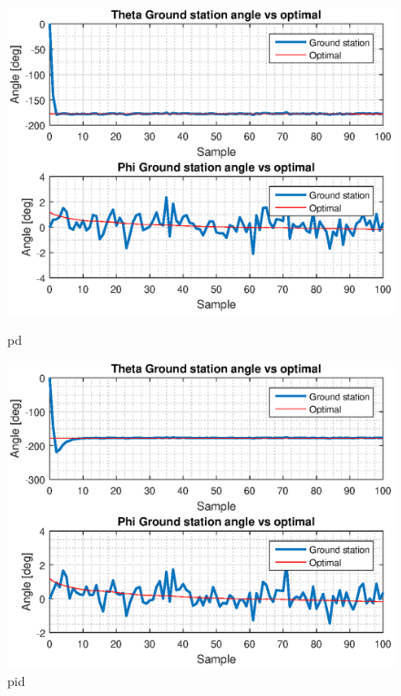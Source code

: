 \begin{figure}[H]
\vspace*{0.5cm} %
\begin{minipage}[t]{0.45\textwidth}
\includegraphics[width=\linewidth]{figures/s1_pd_gs_theta_phi_optimal.eps}
\caption{pd}
\label{fig:s1_gs_pd}
\end{minipage}
\hspace{\fill}
\begin{minipage}[t]{0.45\textwidth}
\includegraphics[width=\linewidth]{figures/s1_pid_gs_theta_phi_optimal.eps}
\caption{pid}
\label{fig:s1_gs_pid}
\end{minipage}

\end{figure}

